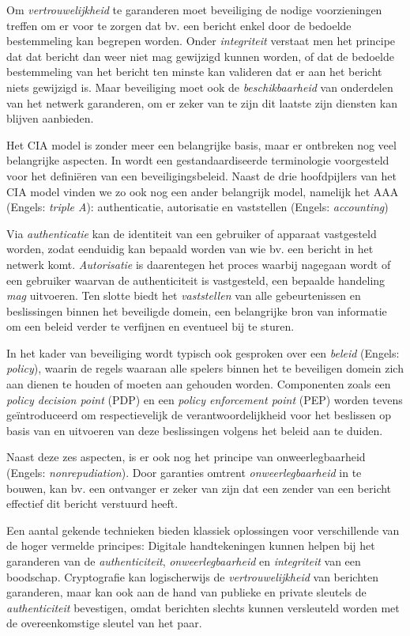 Om \emph{vertrouwelijkheid} te garanderen moet beveiliging de nodige
voorzieningen treffen om er voor te zorgen dat bv. een bericht enkel door de
bedoelde bestemmeling kan begrepen worden. Onder \emph{integriteit} verstaat
men het principe dat dat bericht dan weer niet mag gewijzigd kunnen worden, of
dat de bedoelde bestemmeling van het bericht ten minste kan valideren dat er
aan het bericht niets gewijzigd is. Maar beveiliging moet ook de
\emph{beschikbaarheid} van onderdelen van het netwerk garanderen, om er zeker
van te zijn dit laatste zijn diensten kan blijven aanbieden.

Het CIA model is zonder meer een belangrijke basis, maar er ontbreken nog veel
belangrijke aspecten. In \citep{rfc:3198} wordt een gestandaardiseerde
terminologie voorgesteld voor het defini\"eren van een beveiligingsbeleid.
Naast de drie hoofdpijlers van het CIA model vinden we zo ook nog een ander
belangrijk model, namelijk het AAA (Engels: \emph{triple A}): authenticatie,
autorisatie en vaststellen (Engels: \emph{accounting})

Via \emph{authenticatie} kan de identiteit van een gebruiker of apparaat
vastgesteld worden, zodat eenduidig kan bepaald worden van wie bv. een bericht
in het netwerk komt. \emph{Autorisatie} is daarentegen het proces waarbij
nagegaan wordt of een gebruiker waarvan de authenticiteit is vastgesteld, een
bepaalde handeling \emph{mag} uitvoeren. Ten slotte biedt het
\emph{vaststellen} van alle gebeurtenissen en beslissingen binnen het
beveiligde domein, een belangrijke bron van informatie om een beleid verder te
verfijnen en eventueel bij te sturen.

In het kader van beveiliging wordt typisch ook gesproken over een \emph{beleid}
(Engels: \emph{policy}), waarin de regels waaraan alle spelers binnen het te
beveiligen domein zich aan dienen te houden of moeten aan gehouden worden.
Componenten zoals een \emph{policy decision point} (PDP) en een \emph{policy
enforcement point} (PEP) worden tevens ge\"introduceerd om respectievelijk de
verantwoordelijkheid voor het beslissen op basis van en uitvoeren van deze
beslissingen volgens het beleid aan te duiden.

Naast deze zes aspecten, is er ook nog het principe van onweerlegbaarheid
(Engels: \emph{nonrepudiation}). Door garanties omtrent
\emph{onweerlegbaarheid} in te bouwen, kan bv. een ontvanger er zeker van zijn
dat een zender van een bericht effectief dit bericht verstuurd heeft.

Een aantal gekende technieken bieden klassiek oplossingen voor verschillende
van de hoger vermelde principes: Digitale handtekeningen kunnen helpen bij het
garanderen van de \emph{authenticiteit}, \emph{onweerlegbaarheid} en
\emph{integriteit} van een boodschap. Cryptografie kan logischerwijs de
\emph{vertrouwelijkheid} van berichten garanderen, maar kan ook aan de hand van
publieke en private sleutels de \emph{authenticiteit} bevestigen, omdat
berichten slechts kunnen versleuteld worden met de overeenkomstige sleutel van
het paar.

